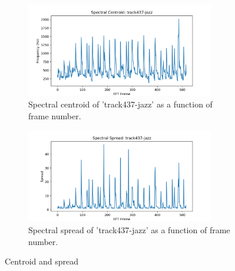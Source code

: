 \documentclass[11pt,a4paper]{article}
\begin{document}
\begin{figure}[tb]\ContinuedFloat
	\begin{subfigure}[t]{\hsize}
		\centering
		\includegraphics[width=0.9\textwidth]{centroid_track437-jazz}
		\caption{Spectral centroid of 'track437-jazz' as a function of frame number.}
		\label{fig:centroid_jazz}
	\end{subfigure}
	\begin{subfigure}[t]{\hsize}
		\centering
		\includegraphics[width=0.9\textwidth]{spread_track437-jazz}
		\caption{Spectral spread of 'track437-jazz' as a function of frame number.}
		\label{fig:spread_metal}
	\end{subfigure}
	\caption{Centroid and spread}
\end{figure}
\clearpage
\end{document}
